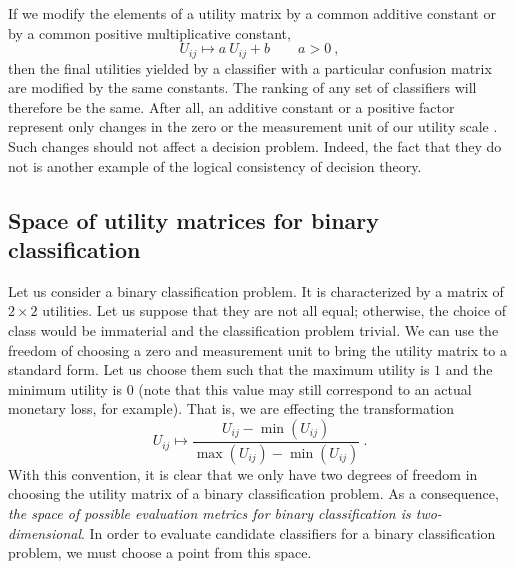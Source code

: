 \documentclass[\ifafour a4paper,12pt,\else a5paper,10pt,\fi%
onecolumn,oneside,article,%
british%
]{memoir}
\theoremstyle{remark}
\theoremstyle{innote}
\renewcommand*{\|}[1][]{\nonscript\:#1\vert\nonscript\:\mathopen{}}
\newcommand*{\sect}{\S}%
\begin{document}
If we modify the elements of a utility matrix by a common additive constant or by a common positive multiplicative constant,
\begin{equation}
  \label{eq:modify_UM}
  U_{ij} \mapsto a\ U_{ij} + b  \qquad a > 0 \ ,
\end{equation}
then the final utilities yielded by a classifier with a particular confusion matrix are modified by the same constants. The ranking of any set of classifiers will therefore be the same. After all, an additive constant or a positive factor represent only changes in the zero or the measurement unit of our utility scale \autocites[cf.][\sect~15.2.2]{russelletal1995_r2022}. Such changes should not affect a decision problem. Indeed, the fact that they do not is another example of the logical consistency of decision theory.

\subsection{Space of utility matrices for binary classification}
\label{sec:dt_space_util}

Let us consider a binary classification problem. It is characterized by a matrix of $2 \times 2$ utilities. Let us suppose that they are not all equal; otherwise, the choice of class would be immaterial and the classification problem trivial. We can use the freedom of choosing a zero and measurement unit to bring the utility matrix to a standard form. Let us choose them such that the maximum utility is $1$ and the minimum utility is $0$ (note that this value may still correspond to an actual monetary loss, for example). That is, we are effecting the transformation
\begin{equation}
  \label{eq:normalize_utilities}
  U_{ij} \mapsto \frac{U_{ij} - \min(U_{ij})}{\max(U_{ij}) - \min(U_{ij})} \ .
\end{equation}
With this convention, it is clear that we only have two degrees of freedom in choosing the utility matrix of a binary classification problem. As a consequence, \emph{the space of possible evaluation metrics for binary classification is two-dimensional}. In order to evaluate candidate classifiers for a binary classification problem, we must choose a point from this space.
\end{document}
